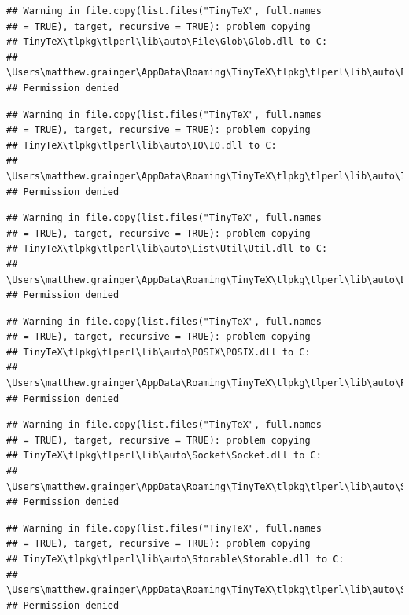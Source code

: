 \documentclass[]{article}
\begin{document}
\begin{verbatim}
## Warning in file.copy(list.files("TinyTeX", full.names
## = TRUE), target, recursive = TRUE): problem copying
## TinyTeX\tlpkg\tlperl\lib\auto\File\Glob\Glob.dll to C:
## \Users\matthew.grainger\AppData\Roaming\TinyTeX\tlpkg\tlperl\lib\auto\File\Glob\Glob.dll:
## Permission denied
\end{verbatim}

\begin{verbatim}
## Warning in file.copy(list.files("TinyTeX", full.names
## = TRUE), target, recursive = TRUE): problem copying
## TinyTeX\tlpkg\tlperl\lib\auto\IO\IO.dll to C:
## \Users\matthew.grainger\AppData\Roaming\TinyTeX\tlpkg\tlperl\lib\auto\IO\IO.dll:
## Permission denied
\end{verbatim}

\begin{verbatim}
## Warning in file.copy(list.files("TinyTeX", full.names
## = TRUE), target, recursive = TRUE): problem copying
## TinyTeX\tlpkg\tlperl\lib\auto\List\Util\Util.dll to C:
## \Users\matthew.grainger\AppData\Roaming\TinyTeX\tlpkg\tlperl\lib\auto\List\Util\Util.dll:
## Permission denied
\end{verbatim}

\begin{verbatim}
## Warning in file.copy(list.files("TinyTeX", full.names
## = TRUE), target, recursive = TRUE): problem copying
## TinyTeX\tlpkg\tlperl\lib\auto\POSIX\POSIX.dll to C:
## \Users\matthew.grainger\AppData\Roaming\TinyTeX\tlpkg\tlperl\lib\auto\POSIX\POSIX.dll:
## Permission denied
\end{verbatim}

\begin{verbatim}
## Warning in file.copy(list.files("TinyTeX", full.names
## = TRUE), target, recursive = TRUE): problem copying
## TinyTeX\tlpkg\tlperl\lib\auto\Socket\Socket.dll to C:
## \Users\matthew.grainger\AppData\Roaming\TinyTeX\tlpkg\tlperl\lib\auto\Socket\Socket.dll:
## Permission denied
\end{verbatim}

\begin{verbatim}
## Warning in file.copy(list.files("TinyTeX", full.names
## = TRUE), target, recursive = TRUE): problem copying
## TinyTeX\tlpkg\tlperl\lib\auto\Storable\Storable.dll to C:
## \Users\matthew.grainger\AppData\Roaming\TinyTeX\tlpkg\tlperl\lib\auto\Storable\Storable.dll:
## Permission denied
\end{verbatim}
\end{document}

